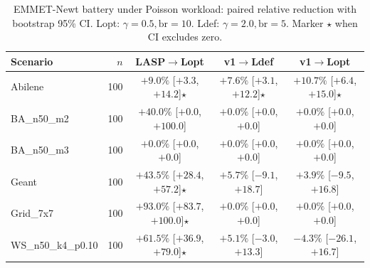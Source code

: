 \begin{table}[h]
\centering
\small
\caption{EMMET-Newt battery under Poisson workload: paired relative reduction with bootstrap 95\% CI. Lopt: $\gamma{=}0.5, \mathrm{br}{=}10$. Ldef: $\gamma{=}2.0, \mathrm{br}{=}5$. Marker $\star$ when CI excludes zero.}
\label{tab:battery_newt}
\begin{tabular}{lrccc}
\toprule
Scenario & $n$ & LASP$\to$Lopt & v1$\to$Ldef & v1$\to$Lopt \\
\midrule
Abilene & 100 & $+9.0\%$ [$+3.3$, $+14.2$]$\star$ & $+7.6\%$ [$+3.1$, $+12.2$]$\star$ & $+10.7\%$ [$+6.4$, $+15.0$]$\star$ \\
BA\_n50\_m2 & 100 & $+40.0\%$ [$+0.0$, $+100.0$] & $+0.0\%$ [$+0.0$, $+0.0$] & $+0.0\%$ [$+0.0$, $+0.0$] \\
BA\_n50\_m3 & 100 & $+0.0\%$ [$+0.0$, $+0.0$] & $+0.0\%$ [$+0.0$, $+0.0$] & $+0.0\%$ [$+0.0$, $+0.0$] \\
Geant & 100 & $+43.5\%$ [$+28.4$, $+57.2$]$\star$ & $+5.7\%$ [$-9.1$, $+18.7$] & $+3.9\%$ [$-9.5$, $+16.8$] \\
Grid\_7x7 & 100 & $+93.0\%$ [$+83.7$, $+100.0$]$\star$ & $+0.0\%$ [$+0.0$, $+0.0$] & $+0.0\%$ [$+0.0$, $+0.0$] \\
WS\_n50\_k4\_p0.10 & 100 & $+61.5\%$ [$+36.9$, $+79.0$]$\star$ & $+5.1\%$ [$-3.0$, $+13.3$] & $-4.3\%$ [$-26.1$, $+16.7$] \\
\bottomrule
\end{tabular}
\end{table}
